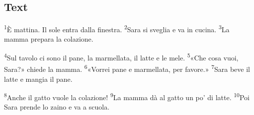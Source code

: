 \documentclass[11pt,a4paper,twoside,openright]{book}
\newenvironment{storytext}{\par\begingroup\large\setlength{\parskip}{8pt}\linespread{1.15}\selectfont}{\par\endgroup}
\newcommand{\sentnum}[1]{\textsuperscript{\color{muted}\tiny #1}}
\begin{document}
\subsection*{Text}
\begin{storytext}
\sentnum{1}È mattina. Il sole entra dalla finestra. \sentnum{2}Sara si sveglia e va in cucina. \sentnum{3}La mamma prepara la colazione.\par
\sentnum{4}Sul tavolo ci sono il pane, la marmellata, il latte e le mele. \sentnum{5}«Che cosa vuoi, Sara?» chiede la mamma. \sentnum{6}«Vorrei pane e marmellata, per favore.» \sentnum{7}Sara beve il latte e mangia il pane.\par
\sentnum{8}Anche il gatto vuole la colazione! \sentnum{9}La mamma dà al gatto un po' di latte. \sentnum{10}Poi Sara prende lo zaino e va a scuola.\par
\end{storytext}
\end{document}
